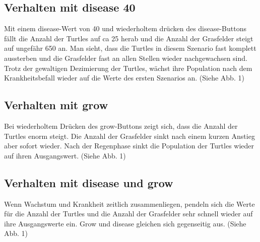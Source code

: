 \documentclass[10pt]{article}%
\theoremstyle{nonumberplain}
\begin{document}
\subsection{Verhalten mit disease 40}
Mit einem disease-Wert von 40 und wiederholtem drücken des disease-Buttons fällt die Anzahl der Turtles auf ca 25 herab und die Anzahl der Grasfelder steigt auf ungefähr 650 an. Man sieht, dass die Turtles in diesem Szenario fast komplett aussterben und die Grasfelder fast an allen Stellen wieder nachgewachsen sind.
Trotz der gewaltigen Dezimierung der Turtles, wächst ihre Population nach dem Krankheitsbefall wieder auf die Werte des ersten Szenarios an. (Siehe Abb. 1) 


\subsection{Verhalten mit grow}
Bei wiederholtem Drücken des grow-Buttons zeigt sich, dass die Anzahl der Turtles enorm steigt. Die Anzahl der Grasfelder sinkt nach einem kurzen Anstieg aber sofort wieder. Nach der Regenphase sinkt die Population der Turtles wieder auf ihren Ausgangswert. (Siehe Abb. 1) 

\subsection{Verhalten mit disease und grow}
Wenn Wachstum und Krankheit zeitlich zusammenliegen, pendeln sich die Werte für die Anzahl der Turtles und die Anzahl der Grasfelder sehr schnell wieder auf ihre Ausgangswerte ein. Grow und disease gleichen sich gegenseitig aus. (Siehe Abb. 1) 
\end{document}
